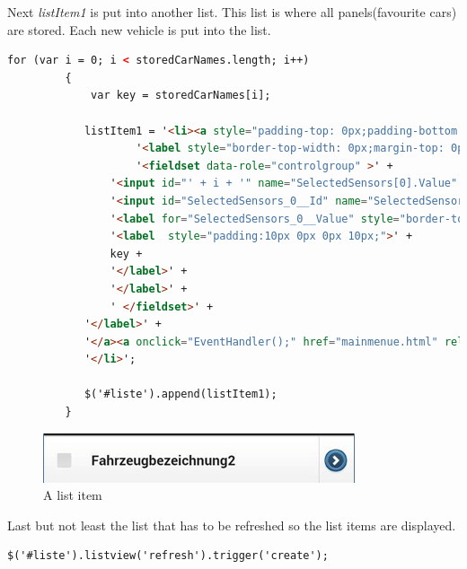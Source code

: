 Next \textit{listItem1} is put into another list. This list is where all panels(favourite cars) are stored. Each new vehicle is put into the list.
\\
\begin{lstlisting}[language=html, caption= 
Adding list items into the list,captionpos=b]
for (var i = 0; i < storedCarNames.length; i++)  
         {
             var key = storedCarNames[i];

            listItem1 = '<li><a style="padding-top: 0px;padding-bottom: 0px;padding-right: 42px;padding-left: 0px;">' +
                    '<label style="border-top-width: 0px;margin-top: 0px;border-bottom-width: 0px;margin-bottom: 0px;border-left-width: 0px;border-right-width: 0px;" data-corners="false">' +
                    '<fieldset data-role="controlgroup" >' +
                '<input id="' + i + '" name="SelectedSensors[0].Value" type="checkbox" value="true" />' +
                '<input id="SelectedSensors_0__Id" name="SelectedSensors[0].Id" type="hidden" value="16" />' +
                '<label for="SelectedSensors_0__Value" style="border-top-width: 0px;margin-top: 0px;border-bottom-width: 0px;margin-bottom: 0px;border-left-width: 0px;border-right-width: 0px;">' +
                '<label  style="padding:10px 0px 0px 10px;">' +
                key +
                '</label>' +
                '</label>' +
                ' </fieldset>' +
            '</label>' +
            '</a><a onclick="EventHandler();" href="mainmenue.html" rel="external"></a>' +
            '</li>';

            $('#liste').append(listItem1);
         }
\end{lstlisting}

\begin{figure}[h]
\centering
\includegraphics[width=0.7\linewidth]{graphics/chapter4/16}
\caption{A list item}
\label{fig:17}
\end{figure}

Last but not least the list that has to be refreshed so the list items are displayed. 
\\

\begin{lstlisting}[language=html, caption= 
Refreshing the list,captionpos=b]
$('#liste').listview('refresh').trigger('create'); 
\end{lstlisting}

